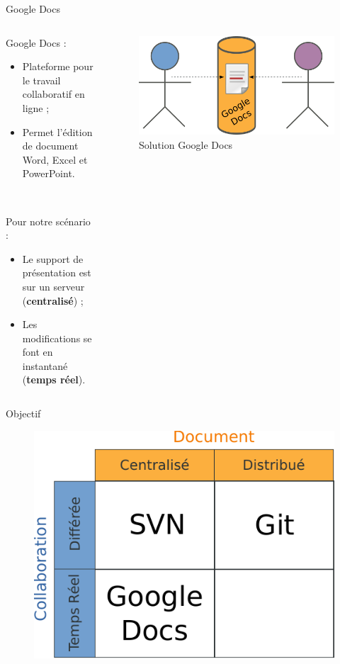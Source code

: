 \begin{frame}{Google Docs}
\begin{columns}
  \begin{column}{.5\textwidth}
  Google Docs :
  \begin{itemize}
    \item Plateforme pour le travail collaboratif en ligne ;
    \item Permet l'édition de document Word, Excel et PowerPoint.
  \end{itemize}~

  Pour notre scénario :
  \begin{itemize}
    \item Le support de présentation est sur un serveur (\textbf{centralisé}) ;
    \item Les modifications se font en instantané (\textbf{temps réel}).
  \end{itemize}
  \end{column}

  \begin{column}{.45\textwidth}
  \begin{figure}
    \center
    \includegraphics[width=.9\textwidth]{includes/gdocs.pdf}
    \caption{Solution Google Docs}
  \end{figure}
  \end{column}
\end{columns}
\end{frame}

\begin{frame}{Objectif}
  \begin{figure}
    \center
    \includegraphics[width=.7\textwidth]{includes/tab1.pdf}
  \end{figure}
\end{frame}

